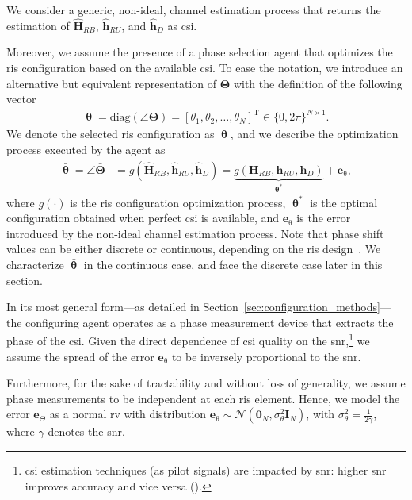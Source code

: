 \documentclass[10pt,journal,compsoc]{IEEEtran}
\newcommand{\ssub}[1]{{\scriptscriptstyle { #1}}}
\newcommand{\mb}[1]{\mathbf{{#1}}}
\newcommand{\tran}{\mathrm{T}}
\newcommand{\diag}{\mathrm{diag}}
\begin{document}
We consider a generic, non-ideal, channel estimation process that returns the estimation of $\hat{\mb{H}}_{\ssub{RB}}$, $\hat{\mb{h}}_{\ssub{RU}}$, and $\hat{\mb{h}}_{\ssub{D}}$ as \gls{csi}.

Moreover, we assume the presence of a phase selection agent that optimizes the \gls{ris} configuration based on the available \gls{csi}.
To ease the notation, we introduce an alternative but equivalent representation of $\mb{\Theta}$ with the definition of the following vector
\begin{align}
\boldsymbol{\uptheta} = \diag{ (\angle \mb{\Theta})} = \left[\theta_1, \theta_2, \dots, \theta_{\ssub{N}} \right]^\tran \in \{0,2\pi\}^{N \times 1}.
\end{align}
We denote the selected \gls{ris} configuration as $\bar{\boldsymbol{\uptheta}}$, and we describe the optimization process executed by the agent as 
\begin{align}
\bar{\boldsymbol{\uptheta}} =\angle \bar{\mb{\Theta}}&= g(\hat{\mb{H}}_{\ssub{RB}}, \hat{\mb{h}}_{\ssub{RU}}, \hat{\mb{h}}_{\ssub{D}}) = \underbrace{g(\mb{H}_{\ssub{RB}}, \mb{h}_{\ssub{RU}}, \mb{h}_{\ssub{D}})}_{\mb{\uptheta}^*} + \mb{e}_{\uptheta}, \label{eq:ris_configuration}
\end{align}
where $g(\cdot)$ is the \gls{ris} configuration optimization process, $\mb{\uptheta}^*$ is the optimal configuration obtained when perfect \gls{csi} is available, and $\mb{e}_{\uptheta}$ is the error introduced by the 
non-ideal channel estimation process.
Note that phase shift values can be either discrete or continuous, depending on the \gls{ris} design~\cite{fara2022prototype, rossanese2022designing}. We characterize $\bar{\boldsymbol{\uptheta}}$ in the continuous case, and face the discrete case later in this section.

In its most general form---as detailed in Section~\ref{sec:configuration_methods}---the configuring agent operates as a phase measurement device that extracts the phase of the \gls{csi}. 
Given the direct dependence of \newpage \gls{csi} quality on the \gls{snr},\footnote{\gls{csi} estimation techniques (as pilot signals) are impacted by \gls{snr}: higher \gls{snr} improves accuracy and vice versa (\cite{steven1993fundamentals}).}
we assume the spread of the error $\mb{e}_{\uptheta}$ to be inversely proportional to the \gls{snr}.

Furthermore, for the sake of tractability and without loss of generality, we assume phase measurements to be independent at each \gls{ris} element.
Hence, we model the error $\mb{e}_{\Theta}$ as a normal \gls{rv} with distribution  $\mb{e}_{\uptheta}\sim\mathcal{N}(\mb{0}_{\ssub{N}}, \sigma_{\theta}^2\mb{I}_{\ssub{N}})$, with $\sigma^2_\theta = \frac{1}{2\gamma}$, where $\gamma$ denotes the \gls{snr}.
\end{document}
